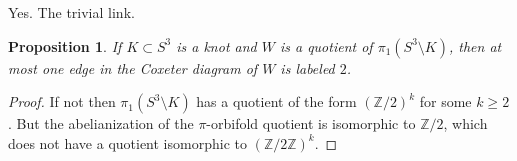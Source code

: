 \documentclass[11pt]{article}
\newtheorem{proposition}[theorem]{Proposition}
\begin{document}
Yes. The trivial link.

\begin{proposition}
If $K \subset S^3$ is a knot and $W$ is a quotient of $\pi_1(S^3 \setminus K)$, then at most one edge in the Coxeter diagram of $W$ is labeled $2$.
\end{proposition}

\begin{proof}
If not then $\pi_1(S^3 \setminus K)$ has a quotient of the form $(\mathbb{Z}/2)^k$ for some $k \geq 2$. But the abelianization of the $\pi$-orbifold quotient is isomorphic to $\mathbb{Z}/2$, which does not have a quotient isomorphic to $(\mathbb{Z}/2\mathbb{Z})^k$.
\end{proof}
\end{document}
